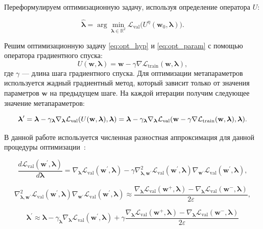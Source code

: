 \documentclass[12pt]{a&t}
\begin{document}
Переформулируем оптимизационную задачу, используя определение оператора $U$:

$$
    \hat{\boldsymbol{\lambda}} = \arg\min\limits_{\boldsymbol{\lambda} \in \mathbb{R}^2} \mathcal{L}_\text{val}\bigl(U^\eta(\mathbf{w}_0, \boldsymbol{\lambda})\bigr).
$$

Решим оптимизационную задачу \eqref{eq:opt_hyp} и \eqref{eq:opt_param} с помощью оператора градиентного спуска:
$$
    U(\mathbf{w}, \boldsymbol{\lambda}) = \mathbf{w} - \gamma\nabla\mathcal{L}_\text{train}(\mathbf{w}, \boldsymbol{\lambda}),
$$
где $\gamma$ --- длина шага градиентного спуска. Для оптимизации метапараметров используется жадный градиентный метод, который зависит только от значения параметров $\mathbf{w}$ на предыдущем шаге. На каждой итерации получим следующее значение метапараметров:

\begin{equation}
    \boldsymbol{\lambda}^\prime = \boldsymbol{\lambda} - \gamma_{\boldsymbol{\lambda}}\nabla_{\boldsymbol{\lambda}}\mathcal{L}_\text{val}(U(\mathbf{w}, \boldsymbol{\lambda}), \boldsymbol{\lambda}) = \boldsymbol{\lambda}\\ - \gamma_{\boldsymbol{\lambda}}\nabla_{\boldsymbol{\lambda}}\mathcal{L}_\text{val}(\mathbf{w} - \gamma\nabla\mathcal{L}_\text{train}(\mathbf{w}, \boldsymbol{\lambda}), \boldsymbol{\lambda}).
    \label{eq:hyp_alg}
\end{equation}

В данной работе используется численная разностная аппроксимация для данной процедуры оптимизации~\cite{liu2018darts}:

$$
\frac{d\mathcal{L}_\text{val}(\mathbf{w}^\prime, \boldsymbol{\lambda})}{d\boldsymbol{\lambda}} = \nabla_{\boldsymbol{\lambda}}\mathcal{L}_\text{val}(\mathbf{w}^\prime, \boldsymbol{\lambda})  - \gamma\nabla^2_{\boldsymbol{\lambda}, \mathbf{w}^\prime}\mathcal{L}_\text{val}(\mathbf{w}^\prime, \boldsymbol{\lambda})\nabla_{\mathbf{w}^\prime}\mathcal{L}_\text{val}(\mathbf{w}^\prime, \boldsymbol{\lambda}),
$$

$$
\nabla^2_{\boldsymbol{\lambda}, \mathbf{w}^\prime}\mathcal{L}_\text{val}(\mathbf{w}^\prime, \boldsymbol{\lambda})\nabla_{\mathbf{w}^\prime}\mathcal{L}_\text{val}(\mathbf{w}^\prime, \boldsymbol{\lambda}) \approx \frac{\nabla_{\boldsymbol{\lambda}}\mathcal{L}_\text{val}(\mathbf{w}^+, \boldsymbol{\lambda}) - \nabla_{\boldsymbol{\lambda}}\mathcal{L}_\text{val}(\mathbf{w}^-, \boldsymbol{\lambda})}{2\varepsilon},
$$

$$
\boldsymbol{\lambda}^\prime \approx \boldsymbol{\lambda} - \gamma_{\boldsymbol{\lambda}}\nabla_{\boldsymbol{\lambda}}\mathcal{L}_\text{val}(\mathbf{w}^\prime, \boldsymbol{\lambda})  + \gamma\frac{\nabla_{\boldsymbol{\lambda}}\mathcal{L}_\text{val}(\mathbf{w}^+, \boldsymbol{\lambda}) - \nabla_{\boldsymbol{\lambda}}\mathcal{L}_\text{val}(\mathbf{w}^-, \boldsymbol{\lambda})}{2\varepsilon}
$$
\end{document}

